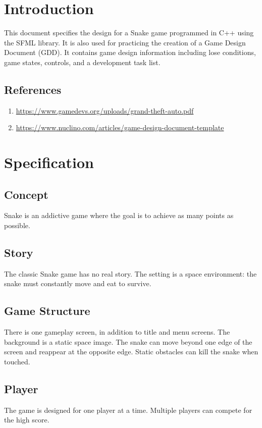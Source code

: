 \section{Introduction}

This document specifies the design for a Snake game programmed in C++ using the SFML library. It is also used for practicing the creation of a Game Design Document (GDD). It contains game design information including lose conditions, game states, controls, and a development task list.

\subsection{References}
\begin{enumerate}
	\item \url{https://www.gamedevs.org/uploads/grand-theft-auto.pdf}
	\item \url{https://www.nuclino.com/articles/game-design-document-template}
\end{enumerate}

\section{Specification}

\subsection{Concept}
Snake is an addictive game where the goal is to achieve as many points as possible.

\subsection{Story}
The classic Snake game has no real story. The setting is a space environment: the snake must constantly move and eat to survive.

\subsection{Game Structure}
There is one gameplay screen, in addition to title and menu screens. The background is a static space image. The snake can move beyond one edge of the screen and reappear at the opposite edge. Static obstacles can kill the snake when touched.

\subsection{Player}
The game is designed for one player at a time. Multiple players can compete for the high score.


